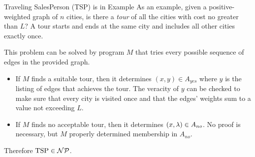 \begin{frame}{Traveling SalesPerson (TSP) is in }{Example}
As an example, given a positive-weighted graph of $n$ cities, is there a \emph{tour} of all the cities with cost no greater than $L$?  A tour starts and ends at the same city and includes all other cities exactly once.

This problem can be solved by program $M$ that tries every possible sequence of edges in the provided graph.
\begin{itemize}
    \item If $M$ finds a suitable tour, then it determines $(x,y)\in A_{yes}$ where $y$ is the listing of edges that achieves the tour.  The veracity of $y$ can be checked to make sure that every city is visited once and that the edges' weights sum to a value not exceeding $L$.
    \item If $M$ finds no acceptable tour, then it determines $(x,\lambda{}) \in A_{no}$.  No proof is necessary, but $M$ properly determined membership in $A_{no}$.
\end{itemize}
Therefore $\mbox{TSP}\in \mathcal{NP}$.
    
\end{frame}
